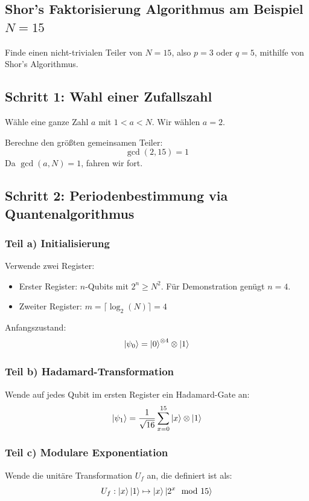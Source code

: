 \subsection{Shor's Faktorisierung Algorithmus am Beispiel \( N = 15 \)}
Finde einen nicht-trivialen Teiler von \( N = 15 \), also \( p = 3 \) oder \( q = 5 \), mithilfe von Shor's Algorithmus.

\subsection*{Schritt 1: Wahl einer Zufallszahl}
Wähle eine ganze Zahl \( a \) mit \( 1 < a < N \).  
Wir wählen \( a = 2 \).

Berechne den größten gemeinsamen Teiler:
\[
\gcd(2, 15) = 1
\]
Da \( \gcd(a, N) = 1 \), fahren wir fort.

\subsection*{Schritt 2: Periodenbestimmung via Quantenalgorithmus}

\subsubsection*{Teil a) Initialisierung}
Verwende zwei Register:
\begin{itemize}
    \item Erster Register: \( n \)-Qubits mit \( 2^n \geq N^2 \). Für Demonstration genügt \( n = 4 \).
    \item Zweiter Register: \( m = \lceil \log_2(N) \rceil = 4 \)
\end{itemize}

Anfangszustand:
\[
\ket{\psi_0} = \ket{0}^{\otimes 4} \otimes \ket{1}
\]

\subsubsection*{Teil b) Hadamard-Transformation}
Wende auf jedes Qubit im ersten Register ein Hadamard-Gate an:
\[
\ket{\psi_1} = \frac{1}{\sqrt{16}} \sum_{x=0}^{15} \ket{x} \otimes \ket{1}
\]

\subsubsection*{Teil c) Modulare Exponentiation}
Wende die unitäre Transformation \( U_f \) an, die definiert ist als:
\[
U_f: \ket{x}\ket{1} \mapsto \ket{x}\ket{2^x \mod 15}
\]

